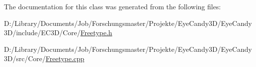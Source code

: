 The documentation for this class was generated from the following files\+:\begin{DoxyCompactItemize}
\item 
D\+:/\+Library/\+Documents/\+Job/\+Forschungsmaster/\+Projekte/\+Eye\+Candy3\+D/\+Eye\+Candy3\+D/include/\+E\+C3\+D/\+Core/\mbox{\hyperlink{_freetype_8h}{Freetype.\+h}}\item 
D\+:/\+Library/\+Documents/\+Job/\+Forschungsmaster/\+Projekte/\+Eye\+Candy3\+D/\+Eye\+Candy3\+D/src/\+Core/\mbox{\hyperlink{_freetype_8cpp}{Freetype.\+cpp}}\end{DoxyCompactItemize}
